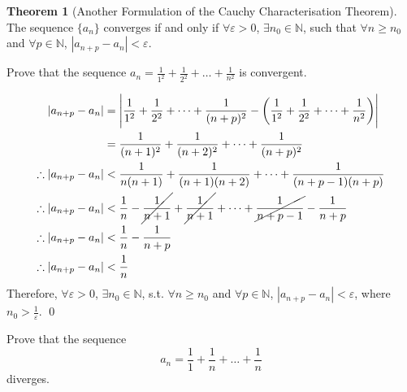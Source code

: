 \documentclass[fleqn, a4paper, 8pt, twoside]{amsart}
\theoremstyle{definition}
\theoremstyle{bluedefinition}
\theoremstyle{redtheorem}
\newtheorem{theorem}{Theorem}
\begin{document}
\begin{multicols}{2}
\begin{spacing}{0.7}
\begin{theorem}[Another Formulation of the Cauchy Characterisation Theorem]
	The sequence $\{a_n\}$ converges if and only if $\forall \varepsilon > 0$, $\exists n_0 \in \mathbb{N}$, such that $\forall n \geq n_0$ and $\forall p \in \mathbb{N}$, $|a_{n + p} - a_n| < \varepsilon$.
	\label{Another formulation of the Cauchy characterisation theorem}
\end{theorem}

\begin{question}
	Prove that the sequence $a_n = \frac{1}{1^2} + \frac{1}{2^2} + \dots + \frac{1}{n^2}$ is convergent.
\end{question}

\begin{solution}
	\begin{align*}
		|a_{n + p} - a_n| &= \left| \frac{1}{1^2} + \frac{1}{2^2} + \dots + \frac{1}{(n + p)^2} - \left( \frac{1}{1^2} + \frac{1}{2^2} + \dots + \frac{1}{n^2} \right) \right|\\
		&= \frac{1}{(n + 1)^2} + \frac{1}{(n + 2)^2} + \dots + \frac{1}{(n + p)^2}\\
		\therefore |a_{n + p} - a_n| &< \frac{1}{n (n + 1)} + \frac{1}{(n + 1)(n + 2)} + \dots + \frac{1}{(n + p - 1)(n + p)}\\
		\therefore |a_{n + p} - a_n| &< \frac{1}{n} - \cancel{\frac{1}{n + 1}} + \cancel{\frac{1}{n + 1}} + \dots + \cancel{\frac{1}{n + p - 1}} - \frac{1}{n + p}\\
		\therefore |a_{n + p} - a_n| &< \frac{1}{n} - \frac{1}{n + p}\\
		\therefore |a_{n + p} - a_n| &< \frac{1}{n}
	\end{align*}
	Therefore, $\forall \varepsilon > 0$, $\exists n_0 \in \mathbb{N}$, s.t. $\forall n \geq n_0$ and $\forall p \in \mathbb{N}$, $|a_{n + p} - a_n| < \varepsilon$, where $n_0 > \frac{1}{\varepsilon}$.
	\qed
\end{solution}

\begin{question}
	Prove that the sequence
	\begin{equation*}
		a_n = \frac{1}{1} + \frac{1}{n} + \dots + \frac{1}{n}
	\end{equation*}
	diverges.
\end{question}


\end{spacing}
\end{multicols}
\end{document}
